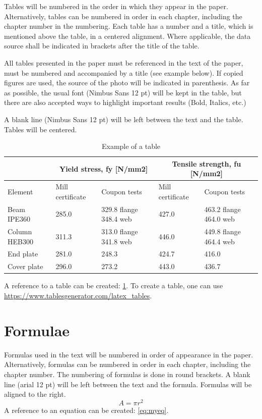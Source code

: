Tables will be numbered in the order in which they appear in the paper. Alternatively, tables can be numbered in order in each chapter, including the chapter number in the numbering. Each table has a number and a title, which is mentioned above the table, in a centered alignment. Where applicable, the data source shall be indicated in brackets after the title of the table.

All tables presented in the paper must be referenced in the text of the paper, must be numbered and accompanied by a title (see example below). If copied figures are used, the source of the photo will be indicated in parenthesis. As far as possible, the usual font (Nimbus Sans 12 pt) will be kept in the table, but there are also accepted ways to highlight important results (Bold, Italics, etc.)

A blank line (Nimbus Sans 12 pt) will be left between the text and the table. Tables will be centered. 

\begin{table}[h]
\caption{Example of a table}
\label{table:table1}
\begin{tabular}{ |p{2.9cm}|p{2cm}|p{3cm}|p{2cm}|p{3cm}|  }
 \hline
  &  \multicolumn{2}{|c|}{Yield stress, fy [N/mm2]} & \multicolumn{2}{|c|}{Tensile strength, fu [N/mm2]} \\
 \hline
 Element & Mill certificate & Coupon tests & Mill certificate & Coupon tests \\
 \hline
 Beam IPE360 & 285.0 & 329.8 flange 348.4 web & 427.0 & 463.2 flange 464.0 web \\
 \hline
 Column HEB300 & 311.3 & 313.0 flange 341.8 web	& 446.0	& 449.8 flange 464.4 web \\
 \hline
 End plate & 281.0 & 248.3 & 424.7 & 416.0 \\
 \hline
 Cover plate & 296.0 & 273.2 & 443.0 & 436.7 \\
 \hline
\end{tabular}
\end{table}


A reference to a table can be created: \cref{table:table1}. To create a table, one can use \label{example:table_url} \url{https://www.tablesgenerator.com/latex_tables}.

\section{Formulae}

Formulas used in the text will be numbered in order of appearance in the paper. Alternatively, formulas can be numbered in order in each chapter, including the chapter number. The numbering of formulas is done in round brackets. A blank line (arial 12 pt) will be left between the text and the formula. Formulas will be aligned to the right.
\begin{equation}
\label{eq:myeq}
A=\pi r^2
\end{equation}
A reference to an equation can be created: \cref{eq:myeq}. 

